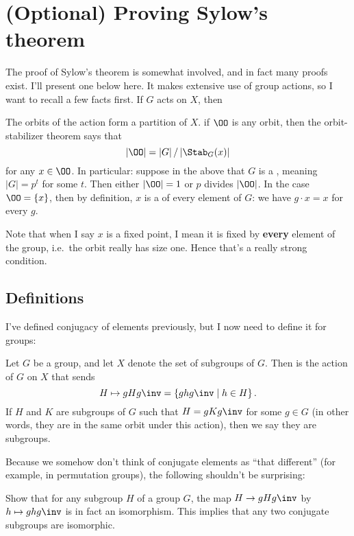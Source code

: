 \section{(Optional) Proving Sylow's theorem}
The proof of Sylow's theorem is somewhat involved,
and in fact many proofs exist.  I'll present one below here.
It makes extensive use of group actions,
so I want to recall a few facts first.
If $G$ acts on $X$, then
\begin{itemize}
	\ii The orbits of the action form a partition of $X$.
	\ii if $\OO$ is any orbit, then the orbit-stabilizer theorem says that
	\[ \left\lvert \OO \right\rvert = \left\lvert G \right\rvert / \left\lvert \Stab_G(x) \right\rvert \]
	for any $x \in \OO$.
	\ii In particular: suppose in the above that $G$ is a ,
	meaning $|G| = p^t$ for some $t$.
	Then either $\left\lvert \OO \right\rvert = 1$ or $p$ divides $\left\lvert \OO \right\rvert$.
	In the case $\OO = \{x\}$, then by definition, $x$ is a  of every element of $G$: we have $g \cdot x = x$ for every $g$.
\end{itemize}
Note that when I say $x$ is a fixed point, I mean it is fixed by \textbf{every} element of the group, i.e.\ the orbit really has size one. Hence that's a really strong condition.

\subsection{Definitions}
I've defined conjugacy of elements previously,
but I now need to define it for groups:
\begin{definition}
	Let $G$ be a group, and let $X$ denote the set of subgroups of $G$.
	Then  is the action of $G$ on $X$ that sends
	\[ H \mapsto gHg\inv = \left\{ ghg\inv \mid h \in H \right\}. \]
	If $H$ and $K$ are subgroups of $G$ such that $H = gKg\inv$ for some $g \in G$
	(in other words, they are in the same orbit under this action),
	then we say they are  subgroups.
\end{definition}

Because we somehow don't think of conjugate elements as
``that different'' (for example, in permutation groups),
the following shouldn't be surprising:
\begin{ques}
	Show that for any subgroup $H$ of a group $G$, the map $H \to gHg\inv$ by
	$h \mapsto ghg\inv$ is in fact an isomorphism.
	This implies that any two conjugate subgroups are isomorphic.
\end{ques}

